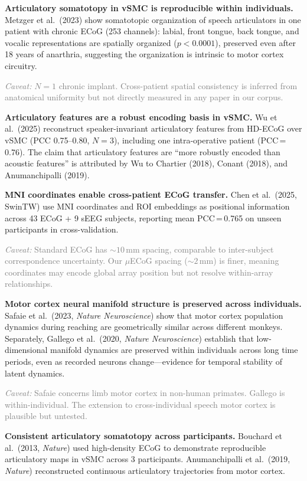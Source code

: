 \documentclass[11pt,letterpaper]{article}
\newcommand{\caveat}[1]{\par\smallskip\noindent\textcolor{gray}{\textit{Caveat:} #1}\smallskip}
\begin{document}
\textbf{Articulatory somatotopy in vSMC is reproducible within individuals.} Metzger et al.\ (2023) show somatotopic organization of speech articulators in one patient with chronic ECoG (253 channels): labial, front tongue, back tongue, and vocalic representations are spatially organized ($p{<}0.0001$), preserved even after 18 years of anarthria, suggesting the organization is intrinsic to motor cortex circuitry.

\caveat{$N{=}1$ chronic implant. Cross-patient spatial consistency is inferred from anatomical uniformity but not directly measured in any paper in our corpus.}

\textbf{Articulatory features are a robust encoding basis in vSMC.} Wu et al.\ (2025) reconstruct speaker-invariant articulatory features from HD-ECoG over vSMC (PCC 0.75--0.80, $N{=}3$), including one intra-operative patient (PCC\,=\,0.76). The claim that articulatory features are ``more robustly encoded than acoustic features'' is attributed by Wu to Chartier (2018), Conant (2018), and Anumanchipalli (2019).

\textbf{MNI coordinates enable cross-patient ECoG transfer.} Chen et al.\ (2025, SwinTW) use MNI coordinates and ROI embeddings as positional information across 43 ECoG + 9 sEEG subjects, reporting mean PCC\,=\,0.765 on unseen participants in cross-validation.

\caveat{Standard ECoG has ${\sim}10$\,mm spacing, comparable to inter-subject correspondence uncertainty. Our $\mu$ECoG spacing (${\sim}2$\,mm) is finer, meaning coordinates may encode global array position but not resolve within-array relationships.}

\textbf{Motor cortex neural manifold structure is preserved across individuals.} Safaie et al.\ (2023, \textit{Nature Neuroscience}) show that motor cortex population dynamics during reaching are geometrically similar across different monkeys. Separately, Gallego et al.\ (2020, \textit{Nature Neuroscience}) establish that low-dimensional manifold dynamics are preserved within individuals across long time periods, even as recorded neurons change---evidence for temporal stability of latent dynamics.

\caveat{Safaie concerns limb motor cortex in non-human primates. Gallego is within-individual. The extension to cross-individual speech motor cortex is plausible but untested.}

\textbf{Consistent articulatory somatotopy across participants.} Bouchard et al.\ (2013, \textit{Nature}) used high-density ECoG to demonstrate reproducible articulatory maps in vSMC across 3 participants. Anumanchipalli et al.\ (2019, \textit{Nature}) reconstructed continuous articulatory trajectories from motor cortex.
\end{document}
